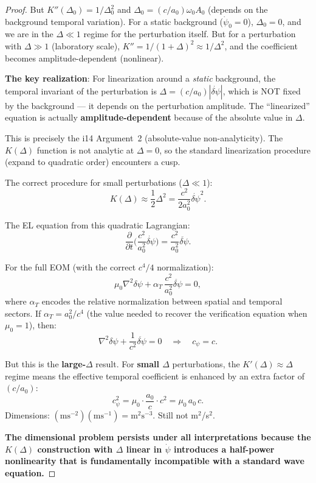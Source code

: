 \documentclass[11pt]{article}
\begin{document}
\begin{proof}
But $K''(\Delta_0) = 1/\Delta_0^2$ and $\Delta_0 = (c/a_0)\omega_0 A_0$
(depends on the background temporal variation). For a static background
($\dot\psi_0 = 0$), $\Delta_0 = 0$, and we are in the $\Delta \ll 1$
regime for the perturbation itself. But for a perturbation with $\Delta \gg 1$
(laboratory scale), $K'' = 1/(1+\Delta)^2 \approx 1/\Delta^2$, and the
coefficient becomes amplitude-dependent (nonlinear).

\textbf{The key realization}: For linearization around a \emph{static}
background, the temporal invariant of the perturbation is
$\Delta = (c/a_0)|\dot{\delta\psi}|$, which is NOT fixed by the
background --- it depends on the perturbation amplitude. The ``linearized''
equation is actually \textbf{amplitude-dependent} because of the absolute
value in $\Delta$.

This is precisely the i14 Argument~2 (absolute-value non-analyticity).
The $K(\Delta)$ function is not analytic at $\Delta = 0$, so the
standard linearization procedure (expand to quadratic order) encounters
a cusp.

The correct procedure for small perturbations ($\Delta \ll 1$):
\begin{equation}
K(\Delta) \approx \frac{1}{2}\Delta^2 = \frac{c^2}{2a_0^2}\dot{\delta\psi}^2.
\end{equation}

The EL equation from this quadratic Lagrangian:
\begin{equation}
\frac{\partial}{\partial t}\biggl(\frac{c^2}{a_0^2}\dot{\delta\psi}\biggr)
= \frac{c^2}{a_0^2}\ddot{\delta\psi}.
\end{equation}

For the full EOM (with the correct $c^4/4$ normalization):
\begin{equation}
\mu_0\nabla^2\delta\psi + \alpha_T\,\frac{c^2}{a_0^2}\ddot{\delta\psi} = 0,
\end{equation}
where $\alpha_T$ encodes the relative normalization between spatial and
temporal sectors. If $\alpha_T = a_0^2/c^4$ (the value needed to recover
the verification equation when $\mu_0 = 1$), then:
\begin{equation}
\nabla^2\delta\psi + \frac{1}{c^2}\ddot{\delta\psi} = 0 \quad \Rightarrow \quad
c_\psi = c.
\end{equation}

But this is the \textbf{large-$\Delta$} result. For \textbf{small $\Delta$}
perturbations, the $K'(\Delta) \approx \Delta$ regime means the effective
temporal coefficient is enhanced by an extra factor of $(c/a_0)$:
\begin{equation}
c_\psi^2 = \mu_0 \cdot \frac{a_0}{c} \cdot c^2 = \mu_0\,a_0\,c.
\end{equation}
Dimensions: $(\text{m}\text{s}^{-2})(\text{m}\text{s}^{-1}) =
\text{m}^2\text{s}^{-3}$. Still not m$^2$/s$^2$.

\textbf{The dimensional problem persists under all interpretations because
the $K(\Delta)$ construction with $\Delta$ linear in $\dot\psi$
introduces a half-power nonlinearity that is fundamentally
incompatible with a standard wave equation.}
\end{proof}
\end{document}

